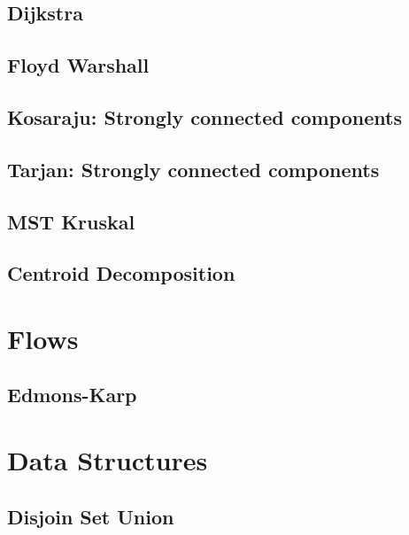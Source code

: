 \subsection{Dijkstra}
\raggedbottom
\hrulefill
\subsection{Floyd Warshall}
\raggedbottom
\hrulefill
\subsection{Kosaraju: Strongly connected components}
\raggedbottom
\hrulefill
\subsection{Tarjan: Strongly connected components}
\raggedbottom
\hrulefill
\subsection{MST Kruskal}
\raggedbottom
\hrulefill
\subsection{Centroid Decomposition}
\raggedbottom
\hrulefill

\section{Flows}
\subsection{Edmons-Karp}
\raggedbottom
\hrulefill

\section{Data Structures}
\subsection{Disjoin Set Union}
\raggedbottom
\hrulefill
